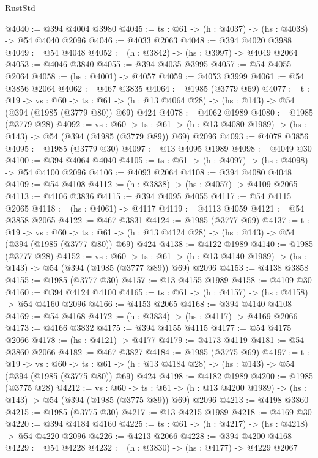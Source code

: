 \begin{lexlean}{RustStd}
\begin{coremodule}
@4040 := @394 @4004 @3980
@4045 := {ts : @61} -> (h : @4037) -> (hs : @4038) -> @54 @4040 @2096
@4046 := @4033 @2063
@4048 := @394 @4020 @3988
@4049 := @54 @4048
@4052 := (h : @3842) -> (hs : @3997) -> @4049 @2064
@4053 := @4046 @3840
@4055 := @394 @4035 @3995
@4057 := @54 @4055 @2064
@4058 := (hs : @4001) -> @4057
@4059 := @4053 @3999
@4061 := @54 @3856 @2064
@4062 := @467 @3835
@4064 := @1985 (@3779 @69)
@4077 := {t : @19} ->
  {vs : @60} ->
  {ts : @61} -> (h : @13 @4064 @28) -> (hs : @143) -> @54 (@394 (@1985 (@3779 @80)) @69) @424
@4078 := @4062 @1989
@4080 := @1985 (@3779 @28)
@4092 := {vs : @60} ->
  {ts : @61} -> (h : @13 @4080 @1989) -> (hs : @143) -> @54 (@394 (@1985 (@3779 @89)) @69) @2096
@4093 := @4078 @3856
@4095 := @1985 (@3779 @30)
@4097 := @13 @4095 @1989
@4098 := @4049 @30
@4100 := @394 @4064 @4040
@4105 := {ts : @61} -> (h : @4097) -> (hs : @4098) -> @54 @4100 @2096
@4106 := @4093 @2064
@4108 := @394 @4080 @4048
@4109 := @54 @4108
@4112 := (h : @3838) -> (hs : @4057) -> @4109 @2065
@4113 := @4106 @3836
@4115 := @394 @4095 @4055
@4117 := @54 @4115 @2065
@4118 := (hs : @4061) -> @4117
@4119 := @4113 @4059
@4121 := @54 @3858 @2065
@4122 := @467 @3831
@4124 := @1985 (@3777 @69)
@4137 := {t : @19} ->
  {vs : @60} ->
  {ts : @61} -> (h : @13 @4124 @28) -> (hs : @143) -> @54 (@394 (@1985 (@3777 @80)) @69) @424
@4138 := @4122 @1989
@4140 := @1985 (@3777 @28)
@4152 := {vs : @60} ->
  {ts : @61} -> (h : @13 @4140 @1989) -> (hs : @143) -> @54 (@394 (@1985 (@3777 @89)) @69) @2096
@4153 := @4138 @3858
@4155 := @1985 (@3777 @30)
@4157 := @13 @4155 @1989
@4158 := @4109 @30
@4160 := @394 @4124 @4100
@4165 := {ts : @61} -> (h : @4157) -> (hs : @4158) -> @54 @4160 @2096
@4166 := @4153 @2065
@4168 := @394 @4140 @4108
@4169 := @54 @4168
@4172 := (h : @3834) -> (hs : @4117) -> @4169 @2066
@4173 := @4166 @3832
@4175 := @394 @4155 @4115
@4177 := @54 @4175 @2066
@4178 := (hs : @4121) -> @4177
@4179 := @4173 @4119
@4181 := @54 @3860 @2066
@4182 := @467 @3827
@4184 := @1985 (@3775 @69)
@4197 := {t : @19} ->
  {vs : @60} ->
  {ts : @61} -> (h : @13 @4184 @28) -> (hs : @143) -> @54 (@394 (@1985 (@3775 @80)) @69) @424
@4198 := @4182 @1989
@4200 := @1985 (@3775 @28)
@4212 := {vs : @60} ->
  {ts : @61} -> (h : @13 @4200 @1989) -> (hs : @143) -> @54 (@394 (@1985 (@3775 @89)) @69) @2096
@4213 := @4198 @3860
@4215 := @1985 (@3775 @30)
@4217 := @13 @4215 @1989
@4218 := @4169 @30
@4220 := @394 @4184 @4160
@4225 := {ts : @61} -> (h : @4217) -> (hs : @4218) -> @54 @4220 @2096
@4226 := @4213 @2066
@4228 := @394 @4200 @4168
@4229 := @54 @4228
@4232 := (h : @3830) -> (hs : @4177) -> @4229 @2067

\end{coremodule}
\end{lexlean}
